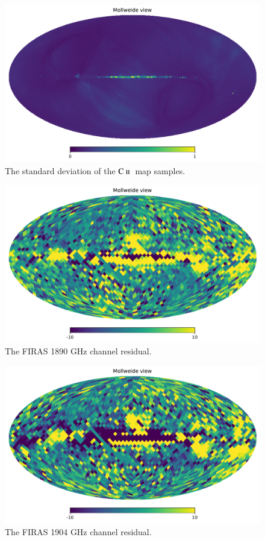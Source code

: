 \documentclass{aa}
\newcommand{\mathsc}[1]{{\normalfont\textsc{#1}}}
\newcommand{\cii}{\ensuremath{\mathsc {C\ ii}}}
\begin{document}
\begin{figure}
    \centering
    \includegraphics[width=\columnwidth]{figures/cii_stdmap.pdf}
    \caption{The standard deviation of the \cii\ map samples.}
    \label{fig:cii_std}
\end{figure}

\begin{figure}
    \centering
    \includegraphics[width=\columnwidth]{figures/res_FIRAS_H1890_c0001_k000700.pdf}
    \caption{The FIRAS 1890 GHz channel residual.}
    \label{fig:firas_1890_res}
\end{figure}

\begin{figure}
    \centering
    \includegraphics[width=\columnwidth]{figures/res_FIRAS_H1904_c0001_k000700.pdf}
    \caption{The FIRAS 1904 GHz channel residual.}
    \label{fig:firas_1904_res}
\end{figure}
\end{document}
